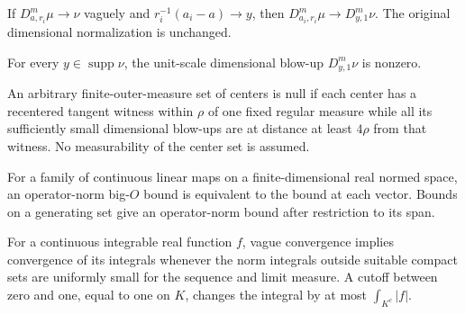\begin{lemma}
\label{lem:dimensional-moving-centers}

If $D^m_{a,r_i}\mu\to\nu$ vaguely and $r_i^{-1}(a_i-a)\to y$, then $D^m_{a_i,r_i}\mu\to D^m_{y,1}\nu$. The original dimensional normalization is unchanged.
\end{lemma}

\begin{lemma}
\label{lem:recenter-nonzero}

For every $y\in\operatorname{supp}\nu$, the unit-scale dimensional blow-up $D^m_{y,1}\nu$ is nonzero.
\end{lemma}

\begin{lemma}
\label{lem:recenter-separated-set-null}

An arbitrary finite-outer-measure set of centers is null if each center has a recentered tangent witness within $\rho$ of one fixed regular measure while all its sufficiently small dimensional blow-ups are at distance at least $4\rho$ from that witness. No measurability of the center set is assumed.
\end{lemma}

\begin{lemma}
\label{lem:finite-dimensional-operator-bigO}

For a family of continuous linear maps on a finite-dimensional real normed space, an operator-norm big-$O$ bound is equivalent to the bound at each vector. Bounds on a generating set give an operator-norm bound after restriction to its span.
\end{lemma}

\begin{lemma}
\label{lem:vague-uniform-norm-tails}

For a continuous integrable real function $f$, vague convergence implies convergence of its integrals whenever the norm integrals outside suitable compact sets are uniformly small for the sequence and limit measure. A cutoff between zero and one, equal to one on $K$, changes the integral by at most $\int_{K^c}|f|$.
\end{lemma}

